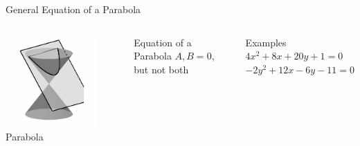 \documentclass[14pt,aspectratio=169]{beamer}
\begin{document}
\begin{frame}{General Equation of a Parabola}
 \begin{columns}
      \centering
        \includegraphics[width=0.8\textwidth]{image09.png}\\Parabola
        \begin{block}{Equation of a Parabola} \centering
        $A,B=0$, but not both  \\
        \end{block}

        \begin{exampleblock}{Examples}
         $4x^2 + 8x + 20y + 1 = 0$ \\
         $-2y^2 + 12x - 6y - 11 = 0$
        \end{exampleblock}

    \end{columns}
\end{frame}
\end{document}
